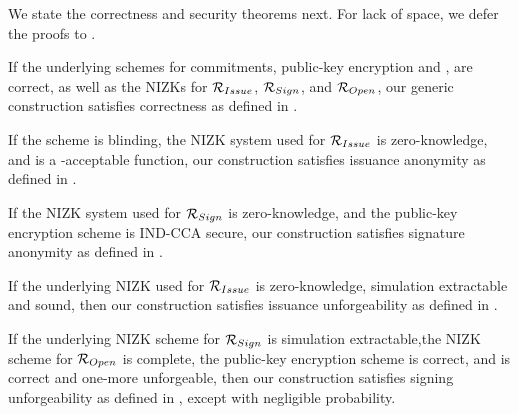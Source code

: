 We state the correctness and security theorems next. For lack of space, we defer
the proofs to .

\begin{theorem}
  \label{thm:correctness-uas}
  If the underlying schemes for commitments, public-key encryption and \SBCM,
  are correct, as well as the NIZKs for $\mathcal{R}_{Issue}$, $\mathcal{R}_{Sign}$,
  and $\mathcal{R}_{Open}$, our generic construction \CUASGen satisfies
  correctness as defined in .
\end{theorem}

\begin{theorem}
  \label{thm:issue-anonymity-uas}
  If the \SBCM scheme is blinding, the NIZK system used for $\mathcal{R}_{Issue}$ 
  is zero-knowledge, and \fissue is a \CUASGen-acceptable function, our \CUASGen
  construction satisfies issuance anonymity as defined in
  .
\end{theorem}

\begin{theorem}
  \label{thm:sign-anonymity-uas}
  If the NIZK system used for $\mathcal{R}_{Sign}$ is zero-knowledge, and the
  public-key encryption scheme is IND-CCA secure, our \CUASGen construction
  satisfies signature anonymity as defined in .
\end{theorem}

\begin{theorem}
  \label{thm:issue-forge-uas}
  If the underlying NIZK used for $\mathcal{R}_{Issue}$ is zero-knowledge,
  simulation extractable and sound, then our \CUASGen construction satisfies
  issuance unforgeability as defined in .
\end{theorem}

\begin{theorem}
  \label{thm:sign-forge-uas}
  If the underlying NIZK scheme for $\mathcal{R}_{Sign}$ is simulation
  extractable,the NIZK scheme for $\mathcal{R}_{Open}$ is complete, the public-key
  encryption scheme is correct, and \SBCM is correct and one-more unforgeable,
  then our \CUASGen construction satisfies signing unforgeability as defined in
  , except with negligible probability.
\end{theorem}

